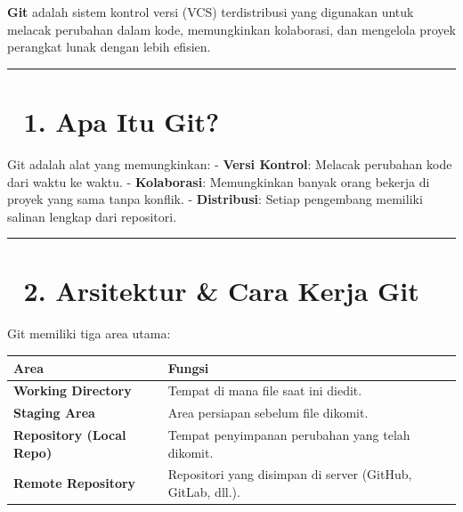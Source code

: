 \documentclass[
  letterpaper,
  DIV=11,
  numbers=noendperiod]{scrreprt}
\begin{document}
\textbf{Git} adalah sistem kontrol versi (VCS) terdistribusi yang
digunakan untuk melacak perubahan dalam kode, memungkinkan kolaborasi,
dan mengelola proyek perangkat lunak dengan lebih efisien.

\begin{center}\rule{0.5\linewidth}{0.5pt}\end{center}

\section{\texorpdfstring{🔹 \textbf{1. Apa Itu
Git?}}{🔹 1. Apa Itu Git?}}\label{apa-itu-git}

Git adalah alat yang memungkinkan: - \textbf{Versi Kontrol}: Melacak
perubahan kode dari waktu ke waktu. - \textbf{Kolaborasi}: Memungkinkan
banyak orang bekerja di proyek yang sama tanpa konflik. -
\textbf{Distribusi}: Setiap pengembang memiliki salinan lengkap dari
repositori.

\begin{center}\rule{0.5\linewidth}{0.5pt}\end{center}

\section{\texorpdfstring{🔹 \textbf{2. Arsitektur \& Cara Kerja
Git}}{🔹 2. Arsitektur \& Cara Kerja Git}}\label{arsitektur-cara-kerja-git}

Git memiliki tiga area utama:

\begin{longtable}[]{@{}
  >{\raggedright\arraybackslash}p{}
  >{\raggedright\arraybackslash}p{}@{}}
\toprule\noalign{}
\begin{minipage}[b]{\linewidth}\raggedright
\textbf{Area}
\end{minipage} & \begin{minipage}[b]{\linewidth}\raggedright
\textbf{Fungsi}
\end{minipage} \\
\midrule\noalign{}
\endhead
\bottomrule\noalign{}
\endlastfoot
\textbf{Working Directory} & Tempat di mana file saat ini diedit. \\
\textbf{Staging Area} & Area persiapan sebelum file dikomit. \\
\textbf{Repository (Local Repo)} & Tempat penyimpanan perubahan yang
telah dikomit. \\
\textbf{Remote Repository} & Repositori yang disimpan di server (GitHub,
GitLab, dll.). \\
\end{longtable}
\end{document}
